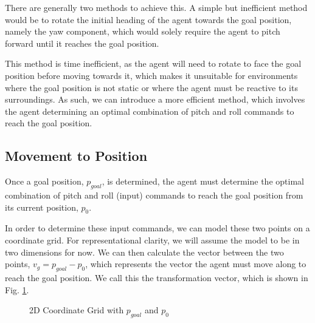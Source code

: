 \documentclass[12pt]{article}
\begin{document}
There are generally two methods to achieve this. A simple but inefficient method would be to rotate the initial heading of the agent towards the goal position, namely the yaw component, which would solely require the agent to pitch forward until it reaches the goal position.

This method is time inefficient, as the agent will need to rotate to face the goal position before moving towards it, which makes it unsuitable for environments where the goal position is not static or where the agent must be reactive to its surroundings. As such, we can introduce a more efficient method, which involves the agent determining an optimal combination of pitch and roll commands to reach the goal position.

\subsection{Movement to Position}
Once a goal position, $p_{goal}$, is determined, the agent must determine the optimal combination of pitch and roll (input) commands to reach the goal position from its current position, $p_0$. 

In order to determine these input commands, we can model these two points on a coordinate grid. For representational clarity, we will assume the model to be in two dimensions for now. We can then calculate the vector between the two points, $v_g = p_{goal} - p_0$, which represents the vector the agent must move along to reach the goal position. We call this the transformation vector, which is shown in Fig. \ref{fig:2d-coords}.

\begin{figure}[ht]
    \centering
    \caption{2D Coordinate Grid with $p_{goal}$ and $p_{0}$}
    \label{fig:2d-coords}
\end{figure}
\end{document}
